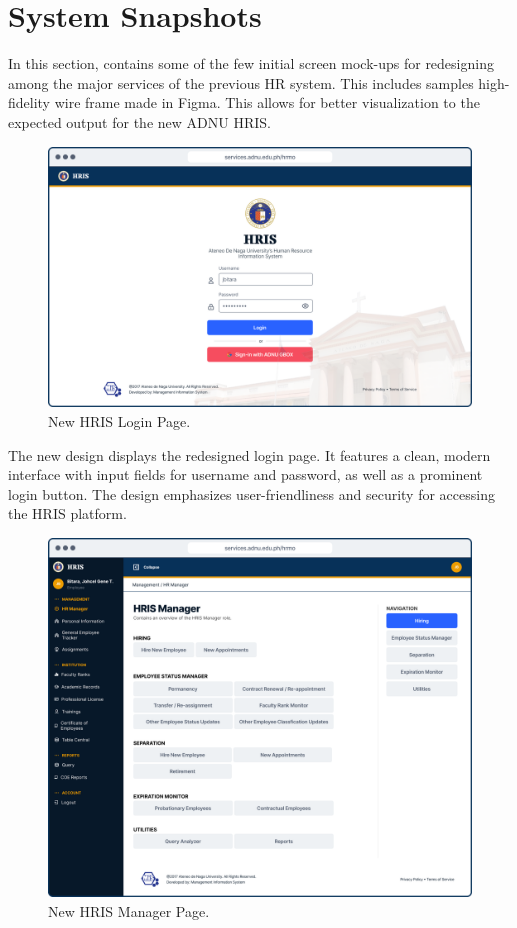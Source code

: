 \section{System Snapshots}

In this section, contains some of the few initial screen mock-ups for redesigning among the major services of the previous HR system. This includes samples high-fidelity wire frame made in Figma. This allows for better visualization to the expected output for the new ADNU HRIS.

    \begin{figure}[H]
        \centering
        \includegraphics[width=1\linewidth]{figures/app/login.png}
        \caption{New HRIS Login Page.}
        \label{fig:app-login}
    \end{figure}

    The new design displays the redesigned login page. It features a clean, modern interface with input fields for username and password, as well as a prominent login button. The design emphasizes user-friendliness and security for accessing the HRIS platform.

    \begin{figure}[H]
        \centering
        \includegraphics[width=1\linewidth]{figures/app/manager.png}
        \caption{New HRIS Manager Page.}
        \label{fig:app-manager}
    \end{figure}

